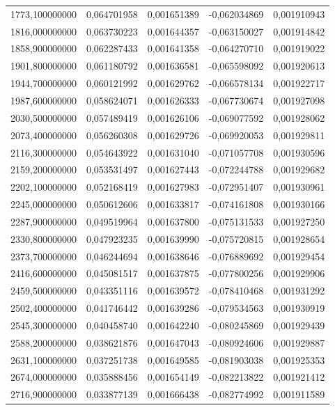 \begin{longtable}{rrrrr}
1773,100000000 & 0,064701958 & 0,001651389 & -0,062034869 & 0,001910943\\
1816,000000000 & 0,063730223 & 0,001644357 & -0,063150027 & 0,001914842\\
1858,900000000 & 0,062287433 & 0,001641358 & -0,064270710 & 0,001919022\\
1901,800000000 & 0,061180792 & 0,001636581 & -0,065598092 & 0,001920613\\
1944,700000000 & 0,060121992 & 0,001629762 & -0,066578134 & 0,001922717\\
1987,600000000 & 0,058624071 & 0,001626333 & -0,067730674 & 0,001927098\\
2030,500000000 & 0,057489419 & 0,001626106 & -0,069077592 & 0,001928062\\
2073,400000000 & 0,056260308 & 0,001629726 & -0,069920053 & 0,001929811\\
2116,300000000 & 0,054643922 & 0,001631040 & -0,071057708 & 0,001930596\\
2159,200000000 & 0,053531497 & 0,001627443 & -0,072244788 & 0,001929682\\
2202,100000000 & 0,052168419 & 0,001627983 & -0,072951407 & 0,001930961\\
2245,000000000 & 0,050612606 & 0,001633817 & -0,074161808 & 0,001930166\\
2287,900000000 & 0,049519964 & 0,001637800 & -0,075131533 & 0,001927250\\
2330,800000000 & 0,047923235 & 0,001639990 & -0,075720815 & 0,001928654\\
2373,700000000 & 0,046244694 & 0,001638646 & -0,076889692 & 0,001929454\\
2416,600000000 & 0,045081517 & 0,001637875 & -0,077800256 & 0,001929906\\
2459,500000000 & 0,043351116 & 0,001639572 & -0,078410468 & 0,001931292\\
2502,400000000 & 0,041746442 & 0,001639286 & -0,079534563 & 0,001930919\\
2545,300000000 & 0,040458740 & 0,001642240 & -0,080245869 & 0,001929439\\
2588,200000000 & 0,038621876 & 0,001647043 & -0,080924606 & 0,001929887\\
2631,100000000 & 0,037251738 & 0,001649585 & -0,081903038 & 0,001925353\\
2674,000000000 & 0,035888456 & 0,001654149 & -0,082213822 & 0,001921412\\
2716,900000000 & 0,033877139 & 0,001666438 & -0,082774992 & 0,001911589\\

\end{longtable}
